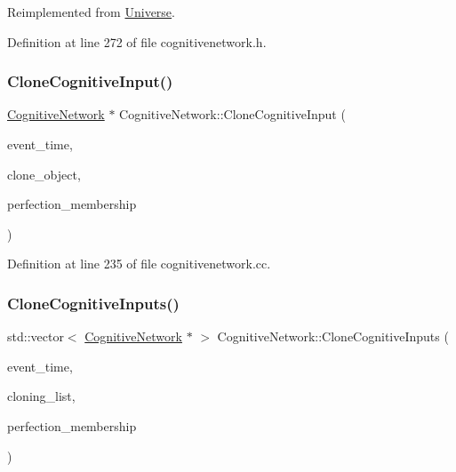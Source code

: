 Reimplemented from \mbox{\hyperlink{class_universe_a46a906baabb63e5d31f8b48ea1fae52e}{Universe}}.



Definition at line 272 of file cognitivenetwork.\+h.

\mbox{\label{class_cognitive_network_a058cb2b044d56268e36f153fac21084e}} 
\subsubsection{\texorpdfstring{Clone\+Cognitive\+Input()}{CloneCognitiveInput()}}
{\footnotesize\ttfamily \mbox{\hyperlink{class_cognitive_network}{Cognitive\+Network}} $\ast$ Cognitive\+Network\+::\+Clone\+Cognitive\+Input (\begin{DoxyParamCaption}\item[{std\+::chrono\+::time\+\_\+point$<$ \mbox{\hyperlink{universe_8h_a0ef8d951d1ca5ab3cfaf7ab4c7a6fd80}{Clock}} $>$}]{event\+\_\+time,  }\item[{\mbox{\hyperlink{class_cognitive_network}{Cognitive\+Network}} $\ast$}]{clone\+\_\+object,  }\item[{double}]{perfection\+\_\+membership }\end{DoxyParamCaption})}



Definition at line 235 of file cognitivenetwork.\+cc.

\mbox{\label{class_cognitive_network_aeaf2883b25dbf1eefd11c2d92efe8816}} 
\subsubsection{\texorpdfstring{Clone\+Cognitive\+Inputs()}{CloneCognitiveInputs()}}
{\footnotesize\ttfamily std\+::vector$<$ \mbox{\hyperlink{class_cognitive_network}{Cognitive\+Network}} $\ast$ $>$ Cognitive\+Network\+::\+Clone\+Cognitive\+Inputs (\begin{DoxyParamCaption}\item[{std\+::chrono\+::time\+\_\+point$<$ \mbox{\hyperlink{universe_8h_a0ef8d951d1ca5ab3cfaf7ab4c7a6fd80}{Clock}} $>$}]{event\+\_\+time,  }\item[{std\+::vector$<$ \mbox{\hyperlink{class_cognitive_network}{Cognitive\+Network}} $\ast$$>$}]{cloning\+\_\+list,  }\item[{double}]{perfection\+\_\+membership }\end{DoxyParamCaption})}



